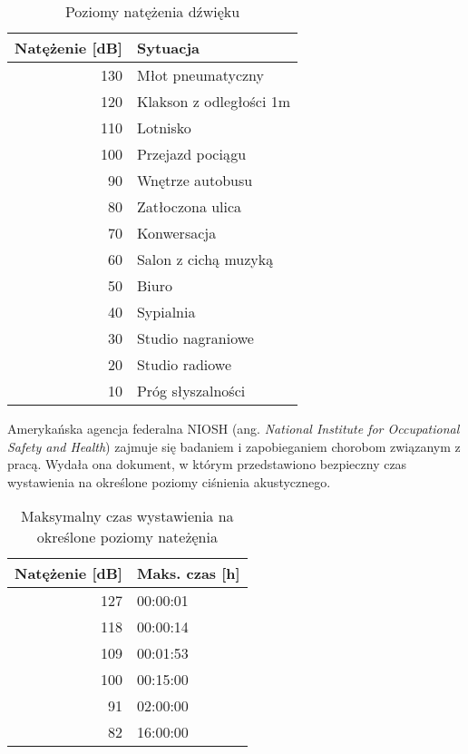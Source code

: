 \begin{table}[!htb]
	\centering
	\begin{tabular}{|r|l|}
		\hline
		Natężenie [dB] & Sytuacja \\
		\hline
		\hline
		\rowcolor{red!50}
		130 & Młot pneumatyczny \\
		\hline
		\rowcolor{red!40}
		120 & Klakson z odległości 1m \\
		\hline
		\rowcolor{red!30}
		110 & Lotnisko \\
		\hline
		\rowcolor{red!20}
		100 & Przejazd pociągu \\
		\hline
		\rowcolor{orange!20}
		90 & Wnętrze autobusu \\
		\hline
		\rowcolor{yellow!20}
		80 & Zatłoczona ulica \\
		\hline
		\rowcolor{green!30}
		70 & Konwersacja \\
		\hline
		\rowcolor{green!30}
		60 & Salon z cichą muzyką \\
		\hline
		\rowcolor{green!30}
		50 & Biuro \\
		\hline
		\rowcolor{green!30}
		40 & Sypialnia \\
		\hline
		\rowcolor{green!30}
		30 & Studio nagraniowe \\
		\hline
		\rowcolor{green!30}
		20 & Studio radiowe \\
		\hline
		\rowcolor{green!30}
		10 & Próg słyszalności \\
		\hline
	\end{tabular}
	\label{tabelaSPL}
	\caption{Poziomy natężenia dźwięku\cite{SPLtable}}
\end{table}


Amerykańska agencja federalna NIOSH (ang. \textit{National Institute for Occupational Safety and Health}) zajmuje się badaniem i zapobieganiem chorobom związanym z pracą. Wydała ona dokument\cite{NIOSH}, w którym przedstawiono bezpieczny czas wystawienia na określone poziomy ciśnienia akustycznego.

\begin{table}[!htb]
	\centering
	\begin{tabular}{|r|l|}
		\hline
		Natężenie [dB] & Maks. czas [h] \\
		\hline
		\hline
		127 & 00:00:01 \\
		\hline
		118 & 00:00:14 \\
		\hline
		109 & 00:01:53 \\
		\hline
		100 & 00:15:00 \\
		\hline
		91 & 02:00:00 \\
		\hline
		82 & 16:00:00 \\
		\hline
	\end{tabular}
	\label{tabelaSPLczas}
	\caption{Maksymalny czas wystawienia na określone poziomy nateżęnia \cite{SPLtable}}
\end{table}